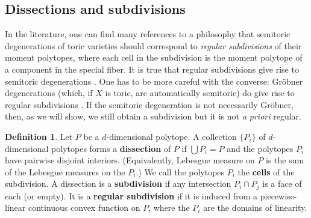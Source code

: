 \documentclass[11pt]{amsart}
\theoremstyle{definition}
\newtheorem{definition}[Thm]{Definition}
\newcommand{\MSB}[1]{\textcolor{violet}{[MSB: #1]}}
\newcommand{\AK}[1]{\textcolor{darkgreen}{[AK: #1]}}
\newcommand{\CC}{\mathbb{C}}
\newcommand{\PP}{\mathbb{P}}
\newcommand\defn[1]{{\bf #1}}
\newcommand\junk[1]{}
\begin{document}
\subsection{Dissections and subdivisions}

In the literature, one can find many references to a philosophy that
semitoric degenerations of toric varieties should
correspond to {\em regular subdivisions} of their moment polytopes, where each cell in the subdivision is the moment polytope of a component in the special fiber.
It is true that regular subdivisions give rise to semitoric degenerations
\cite{sturmfels1991grobner}. One has to be more careful
with the converse: Gr\"obner degenerations (which, if $X$ is toric,
are automatically semitoric) do give rise to regular subdivisions \cite{sturmfels1991grobner}. If the semitoric degeneration is not necessarily Gr\"obner, then, as we will show, we still obtain a subdivision but it is not \emph{a priori} regular.
\junk{
\AK{Should we attempt to demonstrate a degeneration to a nonregular
  subdivision? There's $\PP^2$ inside $\PP(Sym^4\CC^3)$ to a union of $7$
  triangles. (I'm fine with creating new vertices.) Is there a simpler
  example? The pieces don't need to be triangles.} \MSB{I think that would be nice, if it's not too terrible. The 7-triangles example is the smallest/simplest nonregular subdivision I know of.}
}

\begin{definition}
  Let $P$ be a $d$-dimensional polytope. A collection $\{P_i\}$ of
  $d$-dimensional polytopes forms a \defn{dissection} of $P$ if
  $\bigcup P_i = P$ and the polytopes $P_i$ have pairwise disjoint
  interiors. (Equivalently, Lebesgue measure on $P$ is the sum of
  the Lebesgue measures on the $P_i$.) We call the polytopes $P_i$ the \defn{cells} of the subdivision. A dissection is a \defn{subdivision} 
  if any intersection $P_i \cap P_j$ is a face of each (or empty).
  It is a \defn{regular subdivision} if it is induced from a
  piecewise-linear continuous convex function on $P$,
  where the $P_i$ are the domains of linearity.
\end{definition}
\end{document}
